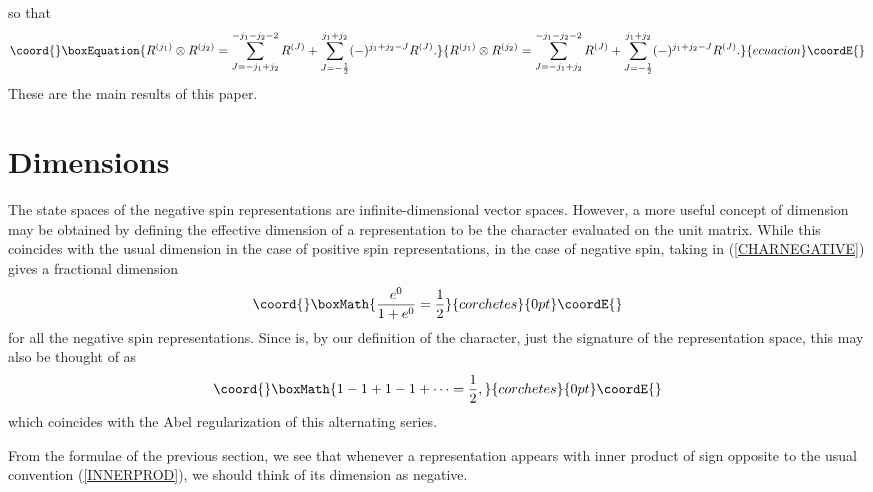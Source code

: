 \documentclass[a4paper,dvips,12pt]{article}
\providecommand {\half} {{1 \over 2}}
\begin{document}
    so that
    \begin{equation}\coord{}\boxEquation{
        R^{(j_1)}\otimes R^{(j_2)} =
            \sum_{J=-j_1 + j_2}^{-j_1 - j_2 -2} R^{(J)}
            + \sum_{J = -\half}^{j_1 + j_2}
           (-)^{j_1 + j_2 - J} R^{(J)}.
           \label{HALFINTDIFF}
    }{
        R^{(j_1)}\otimes R^{(j_2)} =
            \sum_{J=-j_1 + j_2}^{-j_1 - j_2 -2} R^{(J)}
            + \sum_{J = -\half}^{j_1 + j_2}
           (-)^{j_1 + j_2 - J} R^{(J)}.
           }{ecuacion}\coordE{}\end{equation}
    These are the main results of this paper.


    \section{Dimensions}

    The state spaces of the negative spin representations are
    infinite-dimensional vector spaces.  However, a more useful
    concept of dimension may be obtained by defining the effective
    dimension of a representation \coordHE{} to be the character
    \coordHE{} evaluated on the unit matrix.  While this
    coincides with the usual dimension in the case of positive
    spin representations, in the case of negative
    spin, taking \coordHE{} in (\ref{CHARNEGATIVE})
    gives a fractional dimension
    \[\coord{}\boxMath{
        {e^0 \over 1 + e^0} = \half
    }{corchetes}{0pt}\coordE{}\]
    for all the negative spin representations.
    Since \coordHE{}
    is, by our definition of the character, just the signature of the
    representation space, this may also be thought of as
    \[\coord{}\boxMath{
        1 - 1 + 1 - 1 + \cdots = \half,
    }{corchetes}{0pt}\coordE{}\]
    which coincides with the Abel regularization \coordHE{} of this
    alternating series.

    From the formulae of the previous section, we see that
    whenever a representation appears with inner product
    of sign opposite to the
    usual convention (\ref{INNERPROD}),
    we should think of its dimension as
    negative.
\end{document}
